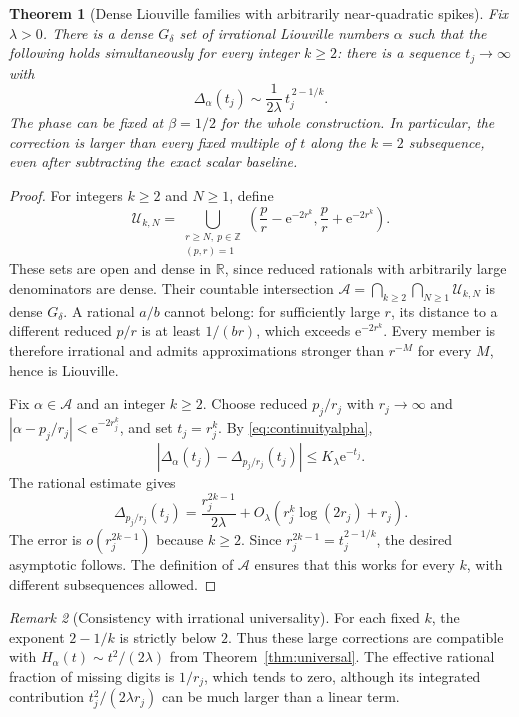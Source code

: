 \documentclass[11pt,a4paper]{article}
\newtheorem{theorem}{Theorem}[section]
\theoremstyle{definition}
\theoremstyle{remark}\newtheorem{remark}[theorem]{Remark}
\newcommand{\R}{\mathbb R}
\newcommand{\e}{\mathrm e}
\begin{document}
\begin{theorem}[Dense Liouville families with arbitrarily near-quadratic spikes]
\label{thm:liouville}
Fix $\lambda>0$.  There is a dense $G_\delta$ set of irrational Liouville
numbers $\alpha$ such that the following holds simultaneously for every
integer $k\ge2$: there is a sequence $t_j\to\infty$ with
\begin{equation}
 \Delta_\alpha(t_j)
 \sim\frac{1}{2\lambda}\,t_j^{\,2-1/k}.
 \label{eq:liouvillespikes}
\end{equation}
The phase can be fixed at $\beta=1/2$ for the whole construction.
In particular, the correction is larger than every fixed multiple of $t$
along the $k=2$ subsequence, even after subtracting the exact scalar baseline.
\end{theorem}
\begin{proof}
For integers $k\ge2$ and $N\ge1$, define
\[
 \mathcal U_{k,N}=
 \bigcup_{\substack{r\ge N,\ p\in\mathbb Z\\(p,r)=1}}
 \left(\frac pr-\e^{-2r^k},\frac pr+\e^{-2r^k}\right).
\]
These sets are open and dense in $\R$, since reduced rationals with
arbitrarily large denominators are dense.  Their countable intersection
$\mathcal A=\bigcap_{k\ge2}\bigcap_{N\ge1}\mathcal U_{k,N}$ is dense
$G_\delta$.  A rational $a/b$ cannot belong: for sufficiently large $r$,
its distance to a different reduced $p/r$ is at least $1/(br)$, which
exceeds $\e^{-2r^k}$.  Every member is therefore irrational and admits
approximations stronger than $r^{-M}$ for every $M$, hence is Liouville.

Fix $\alpha\in\mathcal A$ and an integer $k\ge2$.
Choose reduced $p_j/r_j$ with $r_j\to\infty$ and
$|\alpha-p_j/r_j|<\e^{-2r_j^k}$, and set $t_j=r_j^k$.
By \eqref{eq:continuityalpha},
\[
 |\Delta_\alpha(t_j)-\Delta_{p_j/r_j}(t_j)|
 \le K_\lambda\e^{-t_j}.
\]
The rational estimate gives
\[
 \Delta_{p_j/r_j}(t_j)
 =\frac{r_j^{2k-1}}{2\lambda}
   +O_\lambda(r_j^k\log(2r_j)+r_j).
\]
The error is $o(r_j^{2k-1})$ because $k\ge2$.
Since $r_j^{2k-1}=t_j^{2-1/k}$, the desired asymptotic follows.
The definition of $\mathcal A$ ensures that this works for every $k$,
with different subsequences allowed.
\end{proof}

\begin{remark}[Consistency with irrational universality]
For each fixed $k$, the exponent $2-1/k$ is strictly below $2$.
Thus these large corrections are compatible with
$H_\alpha(t)\sim t^2/(2\lambda)$ from Theorem~\ref{thm:universal}.
The effective rational fraction of missing digits is $1/r_j$, which tends
to zero, although its integrated contribution $t_j^2/(2\lambda r_j)$
can be much larger than a linear term.
\end{remark}
\end{document}
